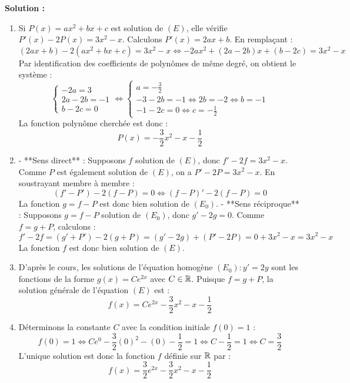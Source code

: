 \textbf{Solution :}
\begin{enumerate}
    \item Si $P(x) = ax^2 + bx + c$ est solution de $(E)$, elle vérifie $P'(x) - 2P(x) = 3x^2 - x$.
    Calculons $P'(x) = 2ax + b$.
    En remplaçant :
    \[
    (2ax + b) - 2(ax^2 + bx + c) = 3x^2 - x \iff -2ax^2 + (2a - 2b)x + (b - 2c) = 3x^2 - x
    \]
    Par identification des coefficients de polynômes de même degré, on obtient le système :
    \[
    \begin{cases}
    -2a = 3 \\
    2a - 2b = -1 \\
    b - 2c = 0
    \end{cases} \iff 
    \begin{cases}
    a = -\frac{3}{2} \\
    -3 - 2b = -1 \iff 2b = -2 \iff b = -1 \\
    -1 - 2c = 0 \iff c = -\frac{1}{2}
    \end{cases}
    \]
    La fonction polynôme cherchée est donc :
    \[
    P(x) = -\frac{3}{2}x^2 - x - \frac{1}{2}
    \]
    
    \item - **Sens direct** : Supposons $f$ solution de $(E)$, donc $f' - 2f = 3x^2 - x$.
      Comme $P$ est également solution de $(E)$, on a $P' - 2P = 3x^2 - x$.
      En soustrayant membre à membre :
      \[
      (f' - P') - 2(f - P) = 0 \iff (f-P)' - 2(f-P) = 0
      \]
      La fonction $g = f-P$ est donc bien solution de $(E_0)$.
      - **Sens réciproque** : Supposons $g = f-P$ solution de $(E_0)$, donc $g' - 2g = 0$.
      Comme $f = g + P$, calculons :
      \[
      f' - 2f = (g' + P') - 2(g + P) = (g' - 2g) + (P' - 2P) = 0 + 3x^2 - x = 3x^2 - x
      \]
      La fonction $f$ est donc bien solution de $(E)$.
      
    \item D'après le cours, les solutions de l'équation homogène $(E_0) : y' = 2y$ sont les fonctions de la forme $g(x) = C e^{2x}$ avec $C \in \mathbb{R}$.
    Puisque $f = g + P$, la solution générale de l'équation $(E)$ est :
    \[
    f(x) = C e^{2x} - \frac{3}{2}x^2 - x - \frac{1}{2}
    \]
    
    \item Déterminons la constante $C$ avec la condition initiale $f(0) = 1$ :
    \[
    f(0) = 1 \iff C e^{0} - \frac{3}{2}(0)^2 - (0) - \frac{1}{2} = 1 \iff C - \frac{1}{2} = 1 \iff C = \frac{3}{2}
    \]
    L'unique solution est donc la fonction $f$ définie sur $\mathbb{R}$ par :
    \[
    f(x) = \frac{3}{2}e^{2x} - \frac{3}{2}x^2 - x - \frac{1}{2}
    \]
\end{enumerate}

